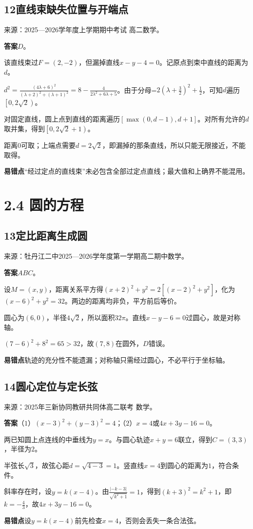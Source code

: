 \documentclass[UTF8,11pt,a4paper,fontset=windows]{ctexart}
\newcommand{\qhead}[2]{\subsection{#1\texorpdfstring{\quad}{ }#2}}
\newcommand{\qsource}[1]{{\footnotesize 来源：#1。\par}}
\begin{document}
\qhead{12}{直线束缺失位置与开端点}
\qsource{2025—2026学年度上学期期中考试 高二数学}
\textbf{答案}\quad \(D\)。\par
该直线束过\(F= \left(2,\allowbreak - 2\right)\)，但漏掉直线\(x- y- 4= 0\)。记原点到束中直线的距离为\(d\)。\par
\(d^{2}= \frac{\left(4\lambda + 6\right)^{2}}{\left(\lambda + 2\right)^{2}+ \left(\lambda + 1\right)^{2}}= 8- \frac{4}{2\lambda ^{2}+ 6\lambda + 5}\)。由于分母=\(2\left(\lambda + \frac{3}{2}\right)^{2}+ \frac{1}{2}\)，可知\(d\)遍历\(\left[0,\allowbreak 2\sqrt{2}\right)\)。\par
对固定直线，圆上点到直线的距离遍历\(\left[\max \left(0,\allowbreak d- 1\right),\allowbreak d+ 1\right]\)。对所有允许的\(d\)取并集，得到\(\left[0,\allowbreak 2\sqrt{2}+ 1\right)\)。\par
距离\(0\)可取；上端点需要\(d= 2\sqrt{2}\)，即漏掉的那条直线，所以只能无限接近，不能取得。\par
{\small\textbf{易错点}\quad “经过定点的直线束”未必包含全部过定点直线；最大值和上确界不能混用。\par}

\clearpage

\section{2.4 圆的方程}


\qhead{13}{定比距离生成圆}
\qsource{牡丹江二中2025—2026学年度第一学期高二期中数学}
\textbf{答案}\quad \(ABC\)。\par
设\(M= \left(x,\allowbreak y\right)\)，距离关系平方得\(\left(x+ 2\right)^{2}+ y^{2}= 2\left[\left(x- 2\right)^{2}+ y^{2}\right]\)，化为\(\left(x- 6\right)^{2}+ y^{2}= 32\)。两边的距离均非负，平方前后等价。\par
圆心为\(\left(6,\allowbreak 0\right)\)，半径\(4\sqrt{2}\)，所以面积\(32\pi \)。直线\(x- y- 6= 0\)过圆心，故是对称轴。\par
\(\left(7- 6\right)^{2}+ 8^{2}= 65> 32\)，故\(\left(7,\allowbreak 8\right)\)在圆外，\(D\)错误。\par
{\small\textbf{易错点}\quad 轨迹的充分性不能遗漏；对称轴只需经过圆心，不必平行于坐标轴。\par}

\qhead{14}{圆心定位与定长弦}
\qsource{2025年三新协同教研共同体高二联考 数学}
\textbf{答案}\quad （\(1\)）\(\left(x- 3\right)^{2}+ \left(y- 3\right)^{2}= 4\)；（\(2\)）\(x= 4\)或\(4x+ 3y- 16= 0\)。\par
两已知圆上点连线的中垂线为\(y= x\)。与圆心轨迹\(x+ y= 6\)联立，得到\(C= \left(3,\allowbreak 3\right)\)，半径为\(2\)。\par
半弦长\(\sqrt{3}\)，故弦心距\(d= \sqrt{4- 3}= 1\)。竖直线\(x= 4\)到圆心的距离为\(1\)，符合条件。\par
斜率存在时，设\(y= k\left(x- 4\right)\)。由\(\frac{\lvert - k- 3\rvert }{\sqrt{k^{2}+ 1}}= 1\)，得到\(\left(k+ 3\right)^{2}= k^{2}+ 1\)，即\(k= - \frac{4}{3}\)，故\(4x+ 3y- 16= 0\)。\par
{\small\textbf{易错点}\quad 设\(y= k\left(x- 4\right)\)前先检查\(x= 4\)，否则会丢失一条合法弦。\par}
\end{document}
